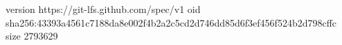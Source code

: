 version https://git-lfs.github.com/spec/v1
oid sha256:43393a4561c7188da8e002f4b2a2c5cd2d746dd85d6f3ef456f524b2d798cffc
size 2793629
